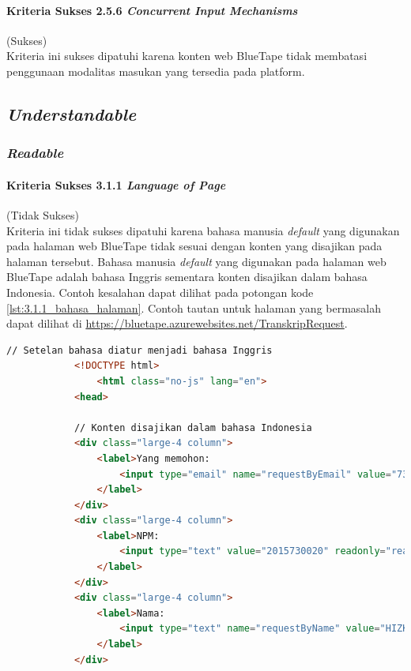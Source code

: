\documentclass[a4paper,twoside]{article}
\begin{document}
\begin{enumerate}
		\paragraph{Kriteria Sukses 2.5.6 \textit{Concurrent Input Mechanisms}}
		\label{par:kepatuhan_bluetape_kriteria_sukses_2.5.6}
		(Sukses)\\

		Kriteria ini sukses dipatuhi karena konten web BlueTape tidak membatasi penggunaan modalitas masukan yang tersedia pada platform.

		\subsection*{\textit{Understandable}}
		\label{subsec:kepatuhan_bluetape_understandable}

		\subsubsection*{\textit{Readable}}
		\label{subsubsec:kepatuhan_bluetape_readable}

		\paragraph{Kriteria Sukses 3.1.1 \textit{Language of Page}}
		\label{par:kepatuhan_bluetape_kriteria_sukses_3.1.1}
		(Tidak Sukses)\\

		Kriteria ini tidak sukses dipatuhi karena bahasa manusia \textit{default} yang digunakan pada halaman web BlueTape tidak sesuai dengan konten yang disajikan pada halaman tersebut. Bahasa manusia \textit{default} yang digunakan pada halaman web BlueTape adalah bahasa Inggris sementara konten disajikan dalam bahasa Indonesia. Contoh kesalahan dapat dilihat pada potongan kode \ref{lst:3.1.1_bahasa_halaman}. Contoh tautan untuk halaman yang bermasalah dapat dilihat di \url{https://bluetape.azurewebsites.net/TranskripRequest}.

		\begin{lstlisting}[frame=single, label={lst:3.1.1_bahasa_halaman}, language=HTML, caption=Kriteria Sukses 3.1.1 - Bahasa yang Tidak Sesuai]
			// Setelan bahasa diatur menjadi bahasa Inggris
			<!DOCTYPE html>
				<html class="no-js" lang="en">
			<head>

			// Konten disajikan dalam bahasa Indonesia
			<div class="large-4 column">
				<label>Yang memohon:
					<input type="email" name="requestByEmail" value="7315020@student.unpar.ac.id" readonly="readonly"/>
				</label>
			</div>
			<div class="large-4 column">
				<label>NPM:
					<input type="text" value="2015730020" readonly="readonly"/>
				</label>
			</div>
			<div class="large-4 column">
				<label>Nama:
					<input type="text" name="requestByName" value="HIZKIA STEVEN" readonly="readonly"/>
				</label>
			</div>
		\end{lstlisting}


\end{enumerate}
\end{document}
